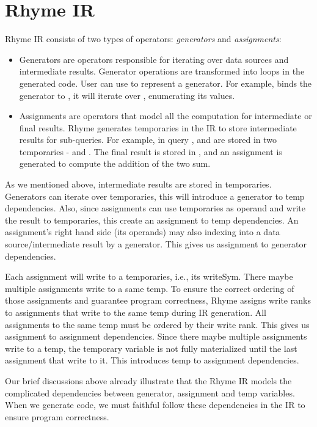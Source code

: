 \documentclass[sigplan, nonacm]{acmart}\settopmatter{printfolios=true,printccs=false,printacmref=false}
\begin{document}
\section{Rhyme IR}\label{rhymeir}
\iffalse
Rhyme IR consists of two types of operators: \textit{generators} and \textit{assignments}:\begin{itemize}
  \item Generators are operators responsible for iterating over data sources and intermediate results. Generator operations are transformed into loops in the generated code. User can use \inline{*} to represent a generator. For example,  binds the generator \inline{*} to , it will iterate over , enumerating its values.
  \item Assignments are operators that model all the computation for intermediate or final results. Rhyme generates temporaries in the IR to store intermediate results for sub-queries. For example, in query ,  and  are stored in two temporaries -  and . The final result is stored in , and an assignment  is generated to compute the addition of the two sum.
\end{itemize}
As we mentioned above, intermediate results are stored in temporaries. Generators can iterate over temporaries, this will introduce a generator to temp dependencies. Also, since assignments can use temporaries as operand and write the result to temporaries, this create an assignment to temp dependencies. An assignment's right hand side (its operands) may also indexing into a data source/intermediate result by a generator. This gives us assignment to generator dependencies.\par
Each assignment will write to a temporaries, i.e., its writeSym. There maybe multiple assignments write to a same temp. To ensure the correct ordering of those assignments and guarantee program correctness, Rhyme assigns write ranks to assignments that write to the same temp during IR generation. All assignments to the same temp must be ordered by their write rank. This gives us assignment to assignment dependencies. Since there maybe multiple assignments write to a temp, the temporary variable is not fully materialized until the last assignment that write to it. This introduces temp to assignment dependencies.\par
Our brief discussions above already illustrate that the Rhyme IR models the complicated dependencies between generator, assignment and temp variables. When we generate code, we must faithful follow these dependencies in the IR to ensure program correctness.\par
\end{document}
